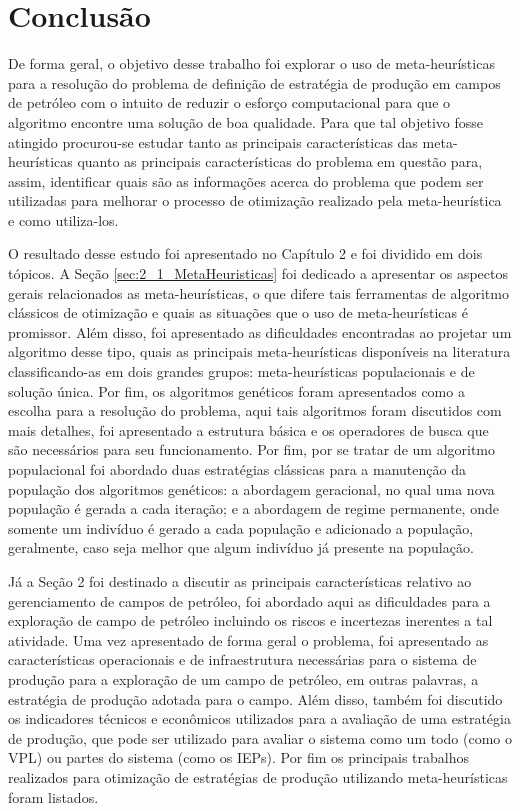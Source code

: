 
\chapter{Conclusão}
\label{ch:6_Conclusao}
De forma geral, o objetivo desse trabalho foi explorar o uso de meta-heurísticas para a resolução do problema de definição de estratégia de produção em campos de petróleo com o intuito de reduzir o esforço computacional para que o algoritmo encontre uma solução de boa qualidade. Para que tal objetivo fosse atingido procurou-se estudar tanto as principais características das meta-heurísticas quanto as principais características do problema em questão para, assim, identificar quais são as informações acerca do problema que podem ser utilizadas para melhorar o processo de otimização realizado pela meta-heurística e como utiliza-los.  

O resultado desse estudo foi apresentado no Capítulo 2 e foi dividido em dois tópicos. A Seção  \ref{sec:2_1_MetaHeuristicas} foi dedicado a apresentar os aspectos gerais relacionados as meta-heurísticas, o que difere tais ferramentas de algoritmo clássicos de otimização e quais as situações que o uso de meta-heurísticas é promissor. Além disso, foi apresentado as dificuldades encontradas ao projetar um algoritmo desse tipo, quais as principais meta-heurísticas disponíveis na literatura classificando-as em dois grandes grupos: meta-heurísticas populacionais e de solução única. Por fim, os algoritmos genéticos foram apresentados como a escolha para a resolução do problema, aqui tais algoritmos foram discutidos com mais detalhes, foi apresentado a estrutura básica e os operadores de busca que são necessários para seu funcionamento. Por fim, por se tratar de um algoritmo populacional foi abordado duas estratégias clássicas para a manutenção da população dos algoritmos genéticos: a abordagem geracional, no qual uma nova população é gerada a cada iteração; e a abordagem de regime permanente, onde somente um indivíduo é gerado a cada população e adicionado a população, geralmente, caso seja melhor que algum indivíduo já presente na população. 

Já a Seção  2 foi destinado a discutir as principais características relativo ao gerenciamento de campos de petróleo, foi abordado aqui as dificuldades para a exploração de campo de petróleo incluindo os riscos e incertezas inerentes a tal atividade. Uma vez apresentado de forma geral o problema, foi apresentado as características operacionais e de infraestrutura necessárias para o sistema de produção para a exploração de um campo de petróleo, em outras palavras, a estratégia de produção adotada para o campo. Além disso, também foi discutido os indicadores técnicos e econômicos utilizados para a avaliação de uma estratégia de produção, que pode ser utilizado para avaliar o sistema como um todo (como o VPL) ou partes do sistema (como os IEPs). Por fim os principais trabalhos realizados para otimização de estratégias de produção utilizando meta-heurísticas foram listados.

